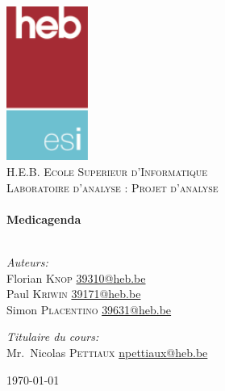 \begin{titlepage}
	\begin{center}

		\includegraphics[keepaspectratio=true,width=0.20\textwidth]{ressources/logo}\\[1cm]

		\textsc{\LARGE H.E.B. Ecole Superieur d'Informatique}\\[1.5cm]

		\textsc{\Large Laboratoire d'analyse : Projet d'analyse}\\[0.5cm]

		\HRule \\[0.4cm]
		{\huge \bfseries Medicagenda \\[0.4cm]}
		\HRule \\[1.5cm]

		\noindent
		\begin{minipage}[t]{0.4\textwidth}
			\begin{flushleft} \large
				\emph{Auteurs:}\\
				Florian \textsc{Knop} \href{mailto:39310@heb.be}{39310@heb.be}\\
				Paul \textsc{Kriwin} \href{mailto:39171@heb.be}{39171@heb.be}\\
				Simon \textsc{Placentino} \href{mailto:39631@heb.be}{39631@heb.be}\
			\end{flushleft}
		\end{minipage}%
		\begin{minipage}[t]{0.4\textwidth}
			\begin{flushright} \large
				\emph{Titulaire du cours:} \\
				Mr.~Nicolas \textsc{Pettiaux}
				\href{mailto:npettiaux@heb.be}{npettiaux@heb.be}
			\end{flushright}
		\end{minipage}

		\vfill

		{\large \today}

	\end{center}
	\clearpage\null\newpage
\end{titlepage}
